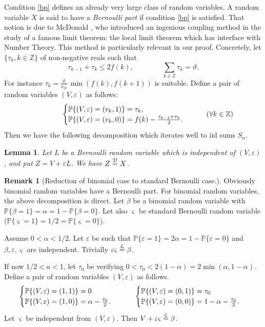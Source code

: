 \documentclass[11pt,draft,reqno]{amsart}
\newtheorem{lemma}[theorem]{Lemma}
\theoremstyle{definition}
\theoremstyle{remarks}
\newtheorem{remark}[theorem]{{\bf  Remark}}
\numberwithin{equation}{section}
\def \a{{\alpha}}
\def \b{{\beta}}
\def \e{{\varepsilon}}
\def \t{{\vartheta}}
\def \qq{{\qquad}}
\def\P{{\mathcal P}}
\def\P{{\mathbb P}}
\def\Z{{\mathbb Z}}
\begin{document}
    Condition \eqref{bp}  defines an already very large class of random variables. A random variable $X$ is said to have a {\it Bernoulli part} if  condition \eqref{bp} is satisfied.  That notion is due to  McDonald \cite{M}, who introduced an ingenious coupling method  in the study of a famous limit theorem: the local limit theorem  which has  interface  with Number Theory.
    This method is particularly relevant in our proof. Concretely, let $  \{ \tau_k, k\in \Z\}$     of   non-negative reals such that
\begin{equation}\label{basber0}  \tau_{k-1}+\tau_k\le 2f(k), \qq  \qq\sum_{k\in \Z}  \tau_k =\t.
\end{equation}
For instance  
 $\tau_k=  \frac{\t}{\nu_X} \, \min(f(k), f(k+1))  $ is suitable.
   Define   a pair of random variables $(V,\e)$   as follows:
  \begin{eqnarray}\label{ve} \qq\qq\begin{cases} {\mathbb P}\{ (V,\e)=( v_k,1)\}=\tau_k,      \cr
 {\mathbb P}\{ (V,\e)=( v_k,0)\}=f(k) -{\tau_{k-1}+\tau_k\over
2}    .  \end{cases}\qq (\forall k\in \Z)
\end{eqnarray}
 Then we have the following decomposition which iterates well to iid sums $S_n$.    \begin{lemma} \label{bpr} Let $L$
be a Bernoulli random variable    which is independent of  $(V,\e)$, and put
 $Z= V+ \e  L$.
We have $Z\buildrel{\mathcal D}\over{ =}X$.
\end{lemma}

 
\begin{remark}[{\tf Reduction of binomial case   to  standard Bernoulli case.}] \rm Obviously binomial random variables have a Bernoulli part.  For  binomial random variables, the above decomposition is   direct. 
Let  $\b $  be a binomial random variable with  $\P\{\b  =1\}= \a = 1-\P\{\b  =0\}$. Let also $\varsigma$  be standard Bernoulli random variable  ($
\P\{\varsigma  =1\}= 1/2=\P\{\varsigma  =0\}$). 

Assume $0<\a<1/2$.  Let $\e $    be such that    $\P\{\e  =1\}= 2\a = 1-\P\{\e  =0\}$ and $\b, \e, \varsigma$ are independent. Trivially  $\e\varsigma \buildrel{\mathcal L}\over{=}\b$. 

 If now $1/2<a<1$, let $\tau_0 $
be  verifying
$0<  \tau_0< 2(1-\a)=2\min (\a,1-\a)$. 
Define a pair of random variables
$(V,\e)$   as follows.  
\begin{eqnarray*}   \begin{cases} \P\{ (V,\e)=(1,1)\}=0  
      \cr   \P\{ (V,\e)=(1,0)\}=\a -{\tau_0 \over
2}    . \end{cases}  \qq \begin{cases}   \P\{ (V,\e)=(0,1)\}=\tau_{0 } 
      \cr 
 \P\{ (V,\e)=( 0,0)\}=1-\a -{ \tau_0\over
2}    . \end{cases} 
\end{eqnarray*}
  Let $ \varsigma$ be  independent from $(V,\e)$.     Then 
$V+\e  \varsigma\buildrel{\mathcal L}\over{=}\b$.  

\end{remark}
  
\end{document}
